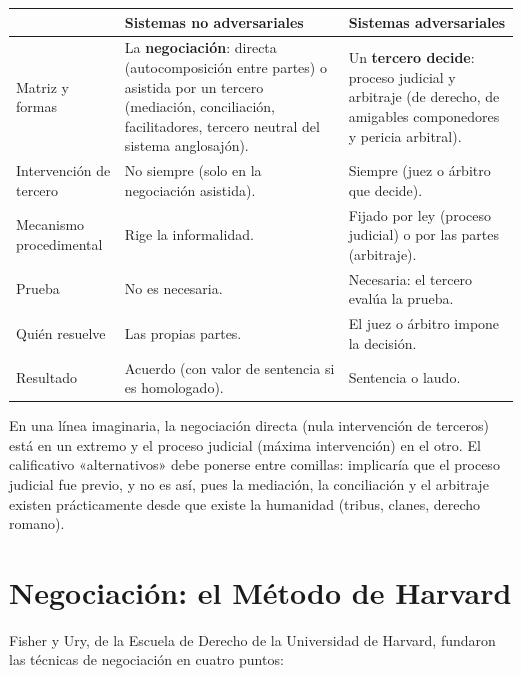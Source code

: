 \documentclass[12pt,oneside]{book}
\renewcommand{\arraystretch}{1.15}
\begin{document}
\begin{table}[H]
\centering
\renewcommand{\arraystretch}{1.25}
\begin{tabularx}{\textwidth}{>{\RaggedRight\arraybackslash}p{}>{\RaggedRight\arraybackslash}X>{\RaggedRight\arraybackslash}X}
\toprule
 & \textbf{Sistemas no adversariales} & \textbf{Sistemas adversariales} \\
\midrule
Matriz y formas & La \textbf{negociación}: directa (autocomposición entre partes) o asistida por un tercero (mediación, conciliación, facilitadores, tercero neutral del sistema anglosajón). & Un \textbf{tercero decide}: proceso judicial y arbitraje (de derecho, de amigables componedores y pericia arbitral). \\
\addlinespace
Intervención de tercero & No siempre (solo en la negociación asistida). & Siempre (juez o árbitro que decide). \\
\addlinespace
Mecanismo procedimental & Rige la informalidad. & Fijado por ley (proceso judicial) o por las partes (arbitraje). \\
\addlinespace
Prueba & No es necesaria. & Necesaria: el tercero evalúa la prueba. \\
\addlinespace
Quién resuelve & Las propias partes. & El juez o árbitro impone la decisión. \\
\addlinespace
Resultado & Acuerdo (con valor de sentencia si es homologado). & Sentencia o laudo. \\
\bottomrule
\end{tabularx}
\end{table}

En una línea imaginaria, la negociación directa (nula intervención de terceros) está en un extremo y el proceso judicial (máxima intervención) en el otro. El calificativo «alternativos» debe ponerse entre comillas: implicaría que el proceso judicial fue previo, y no es así, pues la mediación, la conciliación y el arbitraje existen prácticamente desde que existe la humanidad (tribus, clanes, derecho romano).

\section{Negociación: el Método de Harvard}

Fisher y Ury, de la Escuela de Derecho de la Universidad de Harvard, fundaron las técnicas de negociación en cuatro puntos:
\end{document}
